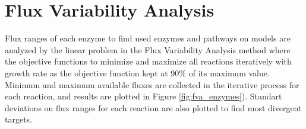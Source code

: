 \begin{table}[H]
\vspace{0.5cm}
\caption[Producing and consuming reaction fluxes for the metabolite oxaloacetate (OXA).]{Producing and consuming reaction fluxes for the metabolite oxaloacetate (OXA).}
\setlength{\tabcolsep}{4pt}
\label{table:12OXA}
\end{table}

\section{Flux Variability Analysis}
Flux ranges of each enzyme to find used enzymes and pathways on models are analyzed by the linear problem in the Flux Variability Analysis method where the objective functions to minimize and maximize all reactions iteratively with growth rate as the objective function kept at 90\% of its maximum value. Minimum and maximum available fluxes are collected in the iterative process for each reaction, and results are plotted in Figure \ref{fig:fva_enzymes}). Standart deviations on flux ranges for each reaction are also plotted to find most divergent targets.

